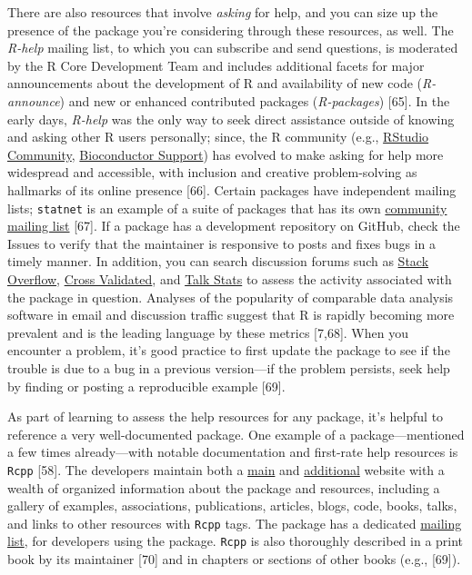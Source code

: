 \documentclass[10pt,letterpaper]{article}
\begin{document}
There are also resources that involve \emph{asking} for help, and you
can size up the presence of the package you're considering through these
resources, as well. The \emph{R-help} mailing list, to which you can
subscribe and send questions, is moderated by the R Core Development
Team and includes additional facets for major announcements about the
development of R and availability of new code (\emph{R-announce}) and
new or enhanced contributed packages (\emph{R-packages}) {[}65{]}. In
the early days, \emph{R-help} was the only way to seek direct assistance
outside of knowing and asking other R users personally; since, the R
community (e.g., \href{https://community.rstudio.com/}{RStudio
Community}, \href{https://support.bioconductor.org/}{Bioconductor
Support}) has evolved to make asking for help more widespread and
accessible, with inclusion and creative problem-solving as hallmarks of
its online presence {[}66{]}. Certain packages have independent mailing
lists; \texttt{statnet} is an example of a suite of packages that has
its own \href{http://statnet.org/}{community mailing list} {[}67{]}. If
a package has a development repository on GitHub, check the Issues to
verify that the maintainer is responsive to posts and fixes bugs in a
timely manner. In addition, you can search discussion forums such as
\href{https://stackoverflow.com/}{Stack Overflow},
\href{https://stats.stackexchange.com/}{Cross Validated}, and
\href{http://www.talkstats.com/}{Talk Stats} to assess the activity
associated with the package in question. Analyses of the popularity of
comparable data analysis software in email and discussion traffic
suggest that R is rapidly becoming more prevalent and is the leading
language by these metrics {[}7,68{]}. When you encounter a problem, it's
good practice to first update the package to see if the trouble is due
to a bug in a previous version---if the problem persists, seek help by
finding or posting a reproducible example {[}69{]}.

As part of learning to assess the help resources for any package, it's
helpful to reference a very well-documented package. One example of a
package---mentioned a few times already---with notable documentation and
first-rate help resources is \texttt{Rcpp} {[}58{]}. The developers
maintain both a \href{http://www.rcpp.org/}{main} and
\href{http://dirk.eddelbuettel.com/code/rcpp.html}{additional} website
with a wealth of organized information about the package and resources,
including a gallery of examples, associations, publications, articles,
blogs, code, books, talks, and links to other resources with
\texttt{Rcpp} tags. The package has a dedicated
\href{https://lists.r-forge.r-project.org/cgi-bin/mailman/listinfo/rcpp-devel}{mailing
list}, for developers using the package. \texttt{Rcpp} is also
thoroughly described in a print book by its maintainer {[}70{]} and in
chapters or sections of other books (e.g., {[}69{]}).
\end{document}
